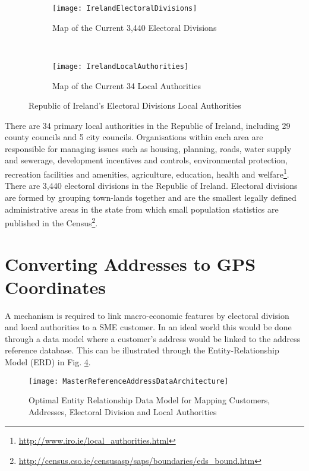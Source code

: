 \begin{figure}[H]
	\begin{subfigure}[b]{0.5\textwidth}
		\captionsetup{font=scriptsize}
		\texttt{[image: IrelandElectoralDivisions]}
		\caption{Map of the Current 3,440 Electoral Divisions}\label{fig:IrelandElectoralDivisions}
	\end{subfigure} ~\quad
	\begin{subfigure}[b]{0.5\textwidth}
		\captionsetup{font=scriptsize}
		\texttt{[image: IrelandLocalAuthorities]}
		\caption{Map of the Current 34 Local Authorities}\label{fig:IrelandLocalAuthorities}
	\end{subfigure}
	\caption{Republic of Ireland's Electoral Divisions Local Authorities}
	\label{fig:Ireland_ED_LA_Example}
\end{figure}

There are 34 primary local authorities in the Republic of Ireland, including 29 county councils and 5 city councils. Organisations within each area are responsible for managing issues such as housing, planning, roads, water supply and sewerage, development incentives and controls, environmental protection, recreation facilities and amenities, agriculture, education, health and welfare\footnote{\url{http://www.iro.ie/local_authorities.html}}. There are 3,440 electoral divisions in the Republic of Ireland. Electoral divisions are formed by grouping town-lands together and are the smallest legally defined administrative areas in the state from which small population statistics are published in the Census\footnote{\url{http://census.cso.ie/censusasp/saps/boundaries/eds_bound.htm}}.


\section{Converting Addresses to GPS Coordinates}
A mechanism is required to link macro-economic features by electoral division and local authorities to a SME customer. In an ideal world this would be done through a data model where a customer's address would be linked to the address reference database. This can be illustrated through the Entity-Relationship Model (ERD) in Fig. \ref{fig:MasterReferenceAddressDataArchitecture}.

\begin{figure}[H]
	\texttt{[image: MasterReferenceAddressDataArchitecture]}
	\caption{Optimal Entity Relationship Data Model for Mapping Customers, Addresses, Electoral Division and Local Authorities}
	\label{fig:MasterReferenceAddressDataArchitecture}
\end{figure}

